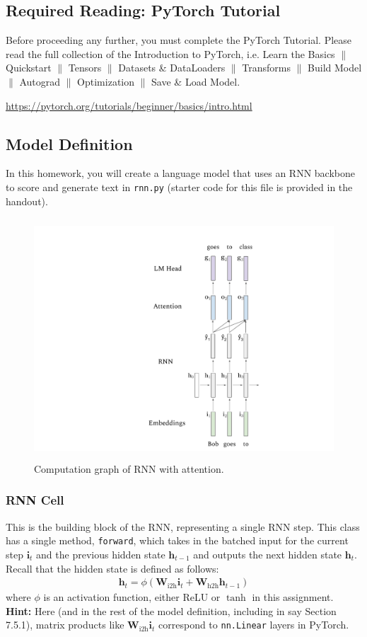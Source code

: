 \documentclass[11pt,addpoints,answers]{exam}
\newcommand{\hv}{\mathbf{h}}
\newcommand{\iv}{\mathbf{i}}
\newcommand{\Wv}{\mathbf{W}}
\begin{document}
\subsection{Required Reading: PyTorch Tutorial}

Before proceeding any further, you must complete the PyTorch Tutorial. Please read the full collection of the Introduction to PyTorch, i.e. Learn the Basics $\|$ Quickstart $\|$ Tensors $\|$ Datasets \& DataLoaders $\|$ Transforms $\|$ Build Model $\|$ Autograd $\|$ Optimization $\|$ Save \& Load Model.    

    \url{https://pytorch.org/tutorials/beginner/basics/intro.html}
    

\subsection{Model Definition}\label{model}
In this homework, you will create a language model that uses an RNN backbone to score and generate text in \texttt{rnn.py} (starter code for this file is provided in the handout).

\begin{figure}[htp]
    \centering
    \includegraphics[height=9cm,width=12cm]{figs/rnn_diagram.pdf}
    \caption{Computation graph of RNN with attention.}
    \label{fig:enter-label}
\end{figure}

\subsubsection{RNN Cell}

This is the building block of the RNN, representing a single RNN step. This class has a single method, \texttt{forward}, which takes in the batched input for the current step $\iv_t$ and the previous hidden state $\hv_{t-1}$ and outputs the next hidden state $\hv_t$. Recall that the hidden state is defined as follows:
\begin{align*}
    \hv_t = \phi( \Wv_\text{i2h} \iv_t + \Wv_\text{h2h} \hv_{t-1} )
\end{align*}
where $\phi$ is an activation function, either ReLU or $\tanh$ in this assignment.
\textbf{Hint:} Here (and in the rest of the model definition, including in say Section 7.5.1), matrix products like $\Wv_\text{i2h} \iv_t$ correspond to \texttt{nn.Linear} layers in PyTorch.
\end{document}
